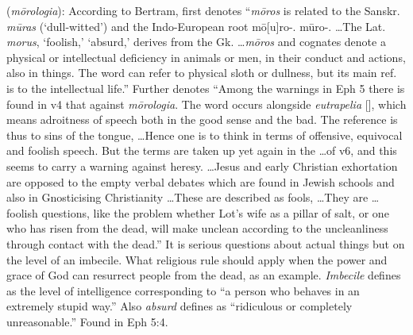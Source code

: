 \item[Absurd speech,]

(\textit{mōrologia}):
According to Bertram,  first denotes ``\emph{mōros} is related to the Sanskr. \emph{mūras} (`dull-witted') and the Indo-European root mō[u]ro-. mūro-. \ldots The Lat. \emph{morus}, `foolish,' `absurd,' derives from the Gk. \ldots \emph{mōros} and cognates denote a physical or intellectual deficiency in animals or men, in their conduct and actions, also in things. The word can refer to physical sloth or dullness, but its main ref. is to the intellectual life.''
Further  denotes ``Among the warnings in Eph 5 there is found in v4 that against \emph{mōrologia}. The word occurs alongside \emph{eutrapelia} [], which means adroitness of speech both in the good sense and the bad. The reference is thus to sins of the tongue, \ldots Hence one is to think in terms of offensive, equivocal and foolish speech. But the terms are taken up yet again in the \ldots of v6, and this seems to carry a warning against heresy. \ldots Jesus and early Christian exhortation are opposed to the empty verbal debates which are found in Jewish schools and also in Gnosticising Christianity \ldots These are described as fools, \ldots They are \ldots foolish questions, like the problem whether Lot's wife as a pillar of salt, or one who has risen from the dead, will make unclean according to the uncleanliness through contact with the dead.''
It is serious questions about actual things but on the level of an imbecile. What religious rule should apply when the power and grace of God can resurrect people from the dead, as an example. \emph{Imbecile} defines as the level of intelligence corresponding to ``a person who behaves in an extremely stupid way.'' Also \emph{absurd} defines as ``ridiculous or completely unreasonable.''
Found in Eph 5:4.
